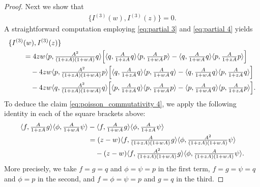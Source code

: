 \documentclass{amsart}
\theoremstyle{definition}
\numberwithin{equation}{section}
\newcommand{\la}{\langle}
\newcommand{\ra}{\rangle}
\begin{document}
\begin{proof}
Next we show that
\begin{align}\label{eq:poisson_commutativity 4}
\{I^{(3)}(w),I ^{(3)}(z) \}=0.
\end{align}
A straightforward computation employing \eqref{eq:partial 3} and \eqref{eq:partial 4} yields
\begin{align*}
\{I^{(3)}&(w),I ^{(3)}(z) \}\\
&=4zw \la p, \tfrac{A^2}{(1+zA)(1+wA)}q\ra\Bigl[  \la q, \tfrac{A}{1+zA}q\ra\la p, \tfrac{A}{1+wA}p\ra -  \la q, \tfrac{A}{1+wA}q\ra\la p, \tfrac{A}{1+zA}p\ra\Bigr]\\
&\quad-4zw\la p, \tfrac{A^2}{(1+zA)(1+wA)}p\ra\Bigl[  \la q, \tfrac{A}{1+zA}q\ra\la p, \tfrac{A}{1+wA}q\ra -  \la q, \tfrac{A}{1+wA}q\ra\la p, \tfrac{A}{1+zA}q\ra\Bigr]\\
&\quad-4zw\la q, \tfrac{A^2}{(1+zA)(1+wA)}q\ra\Bigl[  \la p, \tfrac{A}{1+zA}q\ra\la p, \tfrac{A}{1+wA}p\ra -  \la p, \tfrac{A}{1+wA}q\ra\la p, \tfrac{A}{1+zA}p\ra\Bigr].
\end{align*}
To deduce the claim \eqref{eq:poisson_commutativity 4}, we apply the following identity in each of the square brackets above:
\begin{align}\label{id 2}
 \la f, \tfrac{A}{1+zA}g\ra\la \phi, \tfrac{A}{1+wA}\psi\ra &-  \la f, \tfrac{A}{1+wA}g\ra\la \phi, \tfrac{A}{1+zA}\psi\ra\notag\\
 &=(z-w) \la f, \tfrac{A}{(1+zA)(1+wA)}g\ra \la \phi, \tfrac{A^2}{(1+zA)(1+wA)}\psi\ra\\
 &\quad - (z-w) \la f, \tfrac{A^2}{(1+zA)(1+wA)}g\ra \la \phi, \tfrac{A}{(1+zA)(1+wA)}\psi\ra .\notag
\end{align}
More precisely, we take $f=g=q$ and $\phi=\psi=p$ in the first term, $f=g=\psi=q$ and $\phi=p$ in the second, and $f=\phi=\psi=p$ and $g=q$ in the third.


\end{proof}
\end{document}
